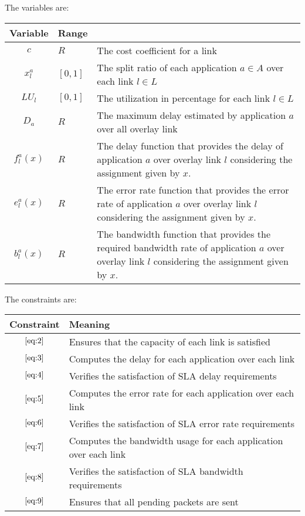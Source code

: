 \documentclass{article}
\begin{document}
	The variables are:
	\begin{center}
		\begin{table}[htb]
			\centering
			\makegapedcells
			\begin{tabular}{|c|l|p{9cm}|}
				\hline
				Variable  & Range & \text{Notes}   \\ \hline
				$c$       & $R$ & The cost coefficient for a link   \\ \hline
				$x^a_l$       & $[0,1]$ & The split ratio of each application $a \in A$ over each link $l \in L$ \\ \hline
				$LU_l$       & $[0,1]$ & The utilization in percentage for each link $l \in L$ \\ \hline
				$D_a$       & $R$ & The maximum delay estimated by application $a$ over all overlay link \\ \hline
				$f^a_l(x)$       & $R$ & The delay function that provides the delay of application $a$ over overlay link $l$ considering the assignment given by $x$. \\ \hline
				$e^a_l(x)$       & $R$ & The error rate function that provides the error rate of application $a$ over overlay link $l$ considering the assignment given by $x$.\\ \hline
				$b^a_l(x)$       & $R$ & The bandwidth function that provides the required bandwidth rate of application $a$ over overlay link $l$ considering the assignment given by $x$.\\ \hline
			\end{tabular}
		\end{table}
	\end{center}
	\pagebreak
	The constraints are:
	
	\begin{center}
		\begin{table}[htb]
			\centering
			\makegapedcells
			\begin{tabular}{|c|p{9cm}|}
				\hline
				Constraint  & Meaning \\ \hline
				$\eqref{eq:2}$ & Ensures that the capacity of each link is satisfied  \\ \hline
				$\eqref{eq:3}$ & Computes the delay for each application over each link \\ \hline
				$\eqref{eq:4}$ & Verifies the satisfaction of SLA delay requirements  \\ \hline
				$\eqref{eq:5}$ & Computes the error rate for each application over each link  \\ \hline
				$\eqref{eq:6}$ & Verifies the satisfaction of SLA error rate requirements  \\ \hline
				$\eqref{eq:7}$ & Computes the bandwidth usage for each application over each link  \\ \hline
				$\eqref{eq:8}$ & Verifies the satisfaction of SLA bandwidth requirements  \\ \hline
				$\eqref{eq:9}$ & Ensures that all pending packets are sent  \\ \hline
			\end{tabular}
		\end{table}
	\end{center}
	 
\end{document}
